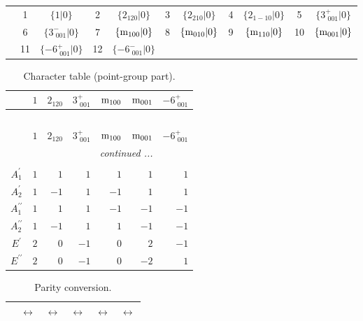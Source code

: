 \documentclass[fleqn,10pt,landscape]{article}
\begin{document}
\begin{itemize}
\begin{center}
\begin{longtable}{c|cc|cc|cc|cc|cc}
 & 1 & $\{1|0\}$ & 2 & $\{2{}_{120}|0\}$ & 3 & $\{2{}_{210}|0\}$ & 4 & $\{2{}_{1-10}|0\}$ & 5 & $\{3^{+}_{\,\,001}|0\}$ \\
& 6 & $\{3^{-}_{\,\,001}|0\}$ & 7 & $\{{\rm m}_{100}|0\}$ & 8 & $\{{\rm m}_{010}|0\}$ & 9 & $\{{\rm m}_{110}|0\}$ & 10 & $\{{\rm m}_{001}|0\}$ \\
& 11 & $\{-6^{+}_{\,\,001}|0\}$ & 12 & $\{-6^{-}_{\,\,001}|0\}$ &  &  &  &  &  &  \\
\end{longtable}
\end{center}
\begin{center}
\renewcommand{\arraystretch}{1.0}
\begin{longtable}{c|rrrrrr}
\caption{Character table (point-group part).}
 \\
 \hline \hline
 & $ 1 $ & $ 2{}_{120} $ & $ 3^{+}_{\,\,001} $ & $ {\rm m}_{100} $ & $ {\rm m}_{001} $ & $ -6^{+}_{\,\,001} $ \\ \hline \endfirsthead

\multicolumn{6}{l}{\tablename\ \thetable{}} \\
 \hline \hline
 & $ 1 $ & $ 2{}_{120} $ & $ 3^{+}_{\,\,001} $ & $ {\rm m}_{100} $ & $ {\rm m}_{001} $ & $ -6^{+}_{\,\,001} $ \\ \hline \endhead

 \hline \hline
\multicolumn{6}{r}{\footnotesize\it continued ...} \\ \endfoot

 \hline \hline
\multicolumn{6}{r}{} \\ \endlastfoot

$ A_{1}^{\prime} $ & $ 1 $ & $ 1 $ & $ 1 $ & $ 1 $ & $ 1 $ & $ 1 $ \\
$ A_{2}^{\prime} $ & $ 1 $ & $ -1 $ & $ 1 $ & $ -1 $ & $ 1 $ & $ 1 $ \\
$ A_{1}^{\prime\prime} $ & $ 1 $ & $ 1 $ & $ 1 $ & $ -1 $ & $ -1 $ & $ -1 $ \\
$ A_{2}^{\prime\prime} $ & $ 1 $ & $ -1 $ & $ 1 $ & $ 1 $ & $ -1 $ & $ -1 $ \\
$ E^{\prime} $ & $ 2 $ & $ 0 $ & $ -1 $ & $ 0 $ & $ 2 $ & $ -1 $ \\
$ E^{\prime\prime} $ & $ 2 $ & $ 0 $ & $ -1 $ & $ 0 $ & $ -2 $ & $ 1 $ \\
\end{longtable}
\end{center}
\begin{center}
\renewcommand{\arraystretch}{1.0}
\begin{longtable}{cccccc}
\caption{Parity conversion.}
 \\
 \hline \hline
 & $\leftrightarrow$ & $\leftrightarrow$ & $\leftrightarrow$ & $\leftrightarrow$ & $\leftrightarrow$ \\ \hline \endfirsthead


\end{longtable}
\end{center}
\end{itemize}
\end{document}
